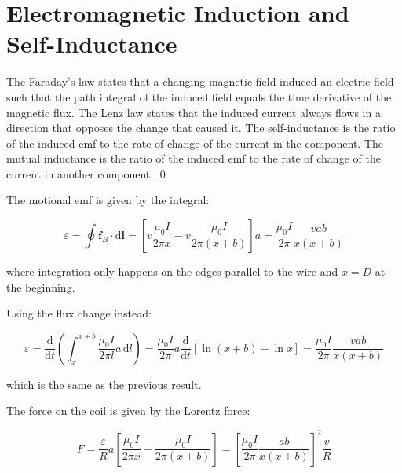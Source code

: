 \documentclass[12pt]{article}
\begin{document}



\pagebreak
\section*{Electromagnetic Induction and Self-Inductance}


The Faraday's law states that a changing magnetic field induced an electric field such that the path integral of the induced field equals the time derivative of the magnetic flux. The Lenz law states that the induced current always flows in a direction that opposes the change that caused it. The self-inductance is the ratio of the induced emf to the rate of change of the current in the component. The mutual inductance is the ratio of the induced emf to the rate of change of the current in another component.
\qed



The motional emf is given by the integral:

\begin{equation}
    \varepsilon = \oint \mathbf{f}_{B} \cdot \mathrm{d}\mathbf{l} = \left[ v \frac{\mu_{0}I}{2\pi x} - v \frac{\mu_{0}I}{2\pi (x + b)} \right] a = \frac{\mu_{0}I}{2\pi} \frac{vab}{x(x + b)}
\end{equation}

where integration only happens on the edges parallel to the wire and $x = D$ at the beginning.

Using the flux change instead:

\begin{equation}
    \varepsilon = \frac{\mathrm{d}}{\mathrm{d}t} \left( \int_{x}^{x + b} \frac{\mu_{0}I}{2\pi l} a \, \mathrm{d}l \right) = \frac{\mu_{0}I}{2\pi} a \frac{\mathrm{d}}{\mathrm{d}t} \left[ \ln{(x + b)} - \ln{x} \right] = \frac{\mu_{0}I}{2\pi} \frac{vab}{x(x + b)}
\end{equation}

which is the same as the previous result.


The force on the coil is given by the Lorentz force:

\begin{equation}
    F = \frac{\varepsilon}{R} a \left[ \frac{\mu_{0}I}{2\pi x} - \frac{\mu_{0}I}{2\pi (x + b)} \right] = \left[ \frac{\mu_{0}I}{2\pi} \frac{ab}{x(x + b)} \right]^{2} \frac{v}{R}
\end{equation}
\end{document}
